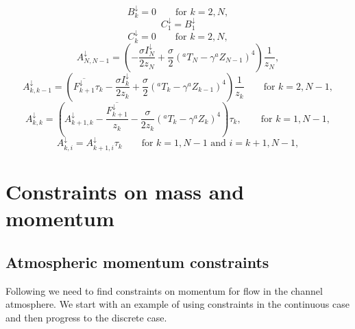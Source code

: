 \documentclass[11pt, a4paper,twoside]{article}
\newcommand{\Z}[2]{{{}^{#1}Z_{#2}}}
\newcommand{\T}[2]{{{}^{#1}T_{#2}}}
\newcommand{\adown}[1]{A^{\downarrow}_{#1}}
\newcommand{\bdown}[1]{B^{\downarrow}_{#1}}
\newcommand{\cdown}[1]{C^{\downarrow}_{#1}}
\newcommand{\idown}[1]{I^{\downarrow}_{#1}}
\newcommand{\Fdown}[1]{{F^{\downarrow}_{#1}}}
\numberwithin{equation}{section}
\begin{document}
\begin{description}
\begin{equation}
\bdown{k} = 0 \quad \quad \textrm{for }k=2,N,
\end{equation}
\begin{equation}
\cdown{1} = \bdown{1}
\end{equation}
\begin{equation}
\cdown{k} = 0 \quad \quad \textrm{for }k=2,N,
\end{equation}
\begin{equation}
\adown{N,N-1} =  \left( - \frac{\sigma \idown{N}}{2 z_N} +  \frac{\sigma}{2}(\T{a}{N} - \gamma \Z{a}{N-1})^4\right) \frac{1}{z_N} ,
\end{equation}
\begin{equation}
\adown{k,k-1} =  \left( \overline{\Fdown{k+1}}\tau_k - \frac{\sigma \idown{k}}{2 z_k} +  \frac{\sigma}{2}(\T{a}{k} - \gamma \Z{a}{k-1})^4\right) \frac{1}{z_k} \quad \quad \textrm{for }k=2,N-1,
\end{equation}
\begin{equation}
\adown{k,k} =  \left( \adown{k+1,k} - \frac{\overline{\Fdown{k+1}}}{z_k} - \frac{\sigma}{2 z_k}(\T{a}{k} - \gamma \Z{a}{k})^4\right) \tau_k,\quad \quad \textrm{for }k=1,N-1,
\end{equation}
\begin{equation}\label{eq:adownki}
\adown{k,i} =   \adown{k+1,i}\tau_k \quad \quad \textrm{for }k=1,N-1\textrm{ and }i = k+1,N-1,
\end{equation}

\end{description}

\section{Constraints on mass and momentum}

\subsection{Atmospheric momentum constraints}\label{app:atcon}

Following \citet{mcwilliams:77} we need to find constraints on momentum for flow in the channel atmosphere.
We start with an example of using constraints in the continuous case and then progress to the discrete case.
\end{document}
